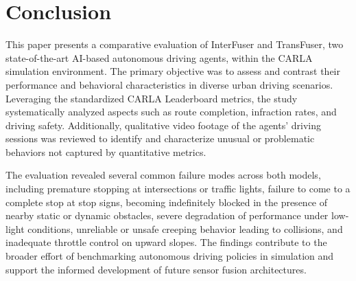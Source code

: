 \section{Conclusion}
\label{sec:conclusion}

This paper presents a comparative evaluation of InterFuser and TransFuser, two state-of-the-art AI-based autonomous driving agents, within the CARLA simulation environment. The primary objective was to assess and contrast their performance and behavioral characteristics in diverse urban driving scenarios. Leveraging the standardized CARLA Leaderboard metrics, the study systematically analyzed aspects such as route completion, infraction rates, and driving safety. Additionally, qualitative video footage of the agents' driving sessions was reviewed to identify and characterize unusual or problematic behaviors not captured by quantitative metrics.

The evaluation revealed several common failure modes across both models, including premature stopping at intersections or traffic lights, failure to come to a complete stop at stop signs, becoming indefinitely blocked in the presence of nearby static or dynamic obstacles, severe degradation of performance under low-light conditions, unreliable or unsafe creeping behavior leading to collisions, and inadequate throttle control on upward slopes. The findings contribute to the broader effort of benchmarking autonomous driving policies in simulation and support the informed development of future sensor fusion architectures.